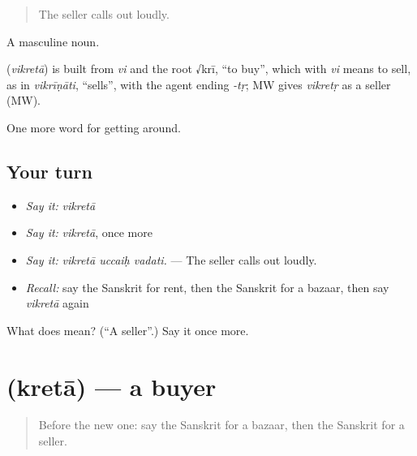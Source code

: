 \begin{quote}
The seller calls out loudly.
\end{quote}

A masculine noun.

\begin{cousinweb}
\textbf{} (\emph{vikretā}) is built from \emph{vi} and the root √krī, \textquotedblleft{}to buy\textquotedblright{}, which with \emph{vi} means to sell, as in \emph{vikrīṇāti}, \textquotedblleft{}sells\textquotedblright{}, with the agent ending \emph{-tṛ}; MW gives \emph{vikretṛ} as a seller (MW).
\end{cousinweb}

\begin{grammarlens}[title={What you've built}]
One more word for getting around.
\end{grammarlens}

\subsection*{Your turn}
\begin{itemize}
\raggedright
  \item \emph{Say it:} \emph{vikretā}
  \item \emph{Say it:} \emph{vikretā}, once more
  \item \emph{Say it:} \emph{vikretā uccaiḥ vadati.} — The seller calls out loudly.
  \item \emph{Recall:} say the Sanskrit for rent, then the Sanskrit for a bazaar, then say \emph{vikretā} again
\end{itemize}

\begin{tcolorbox}[breakable,colback=teal!4,colframe=teal!35!black,title={Before you move on}]
What does  mean? (\textquotedblleft{}A seller\textquotedblright{}.) Say it once more.
\end{tcolorbox}
\section[\texorpdfstring{\sk{क्रेता} (kretā)}{क्रेता (kretā)}]{ (kretā) — a buyer}

\label{lesson:SA-C430-kreta}



\begin{quote}
Before the new one: say the Sanskrit for a bazaar, then the Sanskrit for a seller.
\end{quote}

